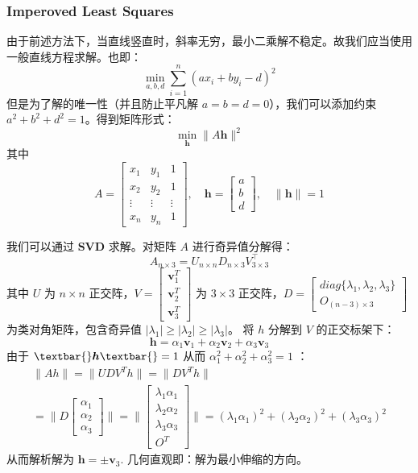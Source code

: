 \subsubsection{Imperoved Least Squares}\label{imperoved-least-squares}

由于前述方法下，当直线竖直时，斜率无穷，最小二乘解不稳定。故我们应当使用一般直线方程求解。也即：
\[
\min_{a,b,d} \sum_{i=1}^n (a x_i + b y_i - d)^2
\] 但是为了解的唯一性（并且防止平凡解
\(a = b = d = 0\)），我们可以添加约束
\(a^2 + b^2 + d^2 = 1\)。得到矩阵形式： \[
\min_{\boldsymbol{h}} \|A \boldsymbol{h}\|^2
\] 其中 \[
A = \begin{bmatrix} x_1 & y_1 & 1 \\ x_2 & y_2 & 1 \\ \vdots & \vdots & \vdots \\ x_n & y_n & 1 \end{bmatrix},\quad
\boldsymbol{h} = \begin{bmatrix} a \\ b \\ d \end{bmatrix},\quad
\|\boldsymbol{h}\| = 1
\]

我们可以通过 \textbf{SVD} 求解。对矩阵 \(A\) 进行奇异值分解得： \[
A_{n\times 3} = U_{n\times n} D_{n\times 3} V_{3\times 3}^\top
\] 其中 \(U\) 为 \(n \times n\)
正交阵，\(V = \begin{bmatrix} \boldsymbol{v}_1^T \\ \boldsymbol{v}_2^T \\ \boldsymbol{v}_3^T \end{bmatrix}\)
为 \(3 \times 3\)
正交阵，\(D = \begin{bmatrix} diag\{\lambda_1, \lambda_2, \lambda_3\} \\ O_{(n-3) \times 3} \end{bmatrix}\)
为类对角矩阵，包含奇异值
\(|\lambda_1| \ge |\lambda_2| \ge |\lambda_3|\)。 将 \(h\) 分解到 \(V\)
的正交标架下： \[
\boldsymbol{h} = \alpha_1 \boldsymbol{v}_1 + \alpha_2 \boldsymbol{v}_2 + \alpha_3 \boldsymbol{v}_3
\] 由于 $ \textbar{}\boldsymbol{h}\textbar{} = 1 $ 从而
\(\alpha_1^2 + \alpha_2^2 + \alpha_3^2 = 1\) ： \[
\begin{aligned}
\| Ah \| = \| U D V^T h \| = \| D V^T h \| \\
= \| D \begin{bmatrix} \alpha_1 \\ \alpha_2 \\ \alpha_3 \end{bmatrix} \|
= \| \begin{bmatrix} \lambda_1 \alpha_1 \\ \lambda_2 \alpha_2 \\ \lambda_3 \alpha_3 \\ O^T \end{bmatrix} \|
= (\lambda_1 \alpha_1)^2 + (\lambda_2 \alpha_2)^2 + (\lambda_3 \alpha_3)^2
\end{aligned}
\] 从而解析解为 \(\boldsymbol{h} = \pm \boldsymbol{v}_3\).
几何直观即：解为最小伸缩的方向。

